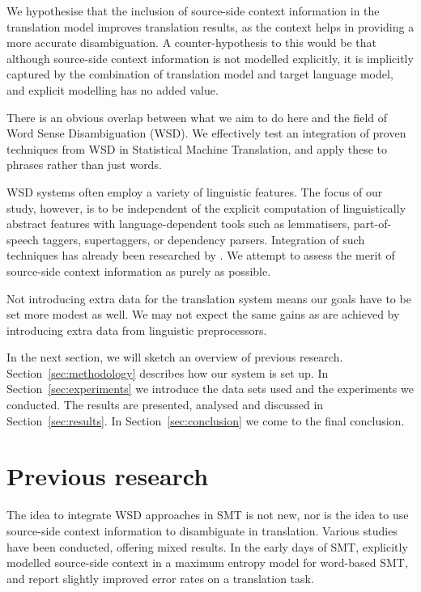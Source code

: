 We hypothesise that the inclusion of source-side context information in the
translation model improves translation results, as the context helps in
providing a more accurate disambiguation. A counter-hypothesis to this would be
that although source-side context information is not modelled explicitly, it is
implicitly captured by the combination of translation model and target language
model, and explicit modelling has no added value.

There is an obvious overlap between what we aim to do here and the field of
Word Sense Disambiguation (WSD). We effectively test an integration of proven
techniques from WSD in Statistical Machine Translation, and apply these to
phrases rather than just words.

WSD systems often employ a variety of linguistic features. The focus of our
study, however, is to be independent of the explicit computation of
linguistically abstract features with language-dependent tools such as
lemmatisers, part-of-speech taggers, supertaggers, or dependency parsers.
Integration of such techniques has already been researched by \cite{Rejwanul+11}. 
We attempt to assess the merit of source-side context information as purely as possible.

Not introducing extra data for the translation system means our goals have to
be set more modest as well. We may not expect the same gains as are achieved by
introducing extra data from linguistic preprocessors.

In the next section, we will sketch an overview of previous research.
Section~\ref{sec:methodology} describes how our system is set up. In
Section~\ref{sec:experiments} we introduce the data sets used and the
experiments we conducted. The results are presented, analysed and
discussed in Section~\ref{sec:results}. In Section~\ref{sec:conclusion} we come
to the final conclusion.

\section{Previous research}

The idea to integrate WSD approaches in SMT is not new, nor is the idea to use
source-side context information to disambiguate in translation. Various studies
have been conducted, offering mixed results. In the early days of SMT,
\cite{GarciaVarea+02} explicitly modelled source-side context in a
maximum entropy model for word-based SMT, and report slightly improved error
rates on a translation task.

